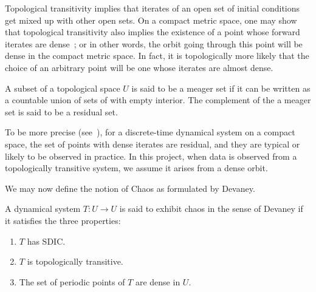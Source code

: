 Topological transitivity implies that iterates of an open set of initial conditions get mixed up with other open sets. On a compact metric space, one may show that topological transitivity also implies the existence of a point whose forward iterates are dense~\cite{de2013elements}; or in other words, the orbit going through this point will be dense in the compact metric space. 
In fact, it is topologically more likely that the choice of an arbitrary point will be one whose iterates are almost dense. 

\begin{Definition}
  \label{Dfn_Meager Set}\rm
A subset of a topological space $U$ is said to be a meager set if it can be written as a countable union of sets of with empty interior. The complement of the a meager set is said to be a residual set.
\end{Definition}

To be more precise (see~\cite{de2013elements}), for a discrete-time dynamical system on a compact space, the set of points with dense iterates are residual, and they are typical or likely to be observed in practice. In this project, when data is observed from a topologically transitive system, we assume it arises from a dense orbit.

We may now define the notion of Chaos as formulated by Devaney\cite{devaney2018introduction}.
\begin{Definition}
  \label{Dfn_ChaosDec}\rm
	A dynamical system $T: U \to U$ is said to exhibit chaos in the sense of Devaney if it satisfies the three properties:
	\vspace{-5mm}
  \begin{enumerate}
		\item $T$ has SDIC.
		\item $T$ is topologically transitive.
		\item The set of periodic points of $T$ are dense in $U$. 
	\end{enumerate}
\end{Definition}




